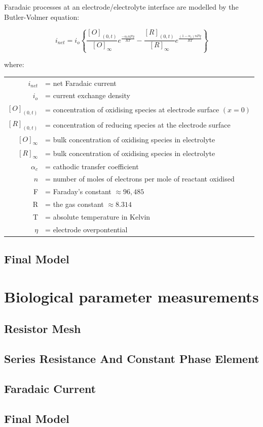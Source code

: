         Faradaic processes at an electrode/electrolyte interface are modelled by the Butler-Volmer equation:

        \begin{equation}
        i_{net}=i_{o}\left\{ \frac{[O]_{(0,t)}}{[O]_{\infty}}e^{\frac{-\alpha_{c}nF\eta}{RT}}-\frac{[R]_{(0,t)}}{[R]_{\infty}}e^{\frac{(1-\alpha_{c})nF\eta}{RT}}\right\}
        \end{equation}


        where:

        \begin{tabular}{rl}
        $i_{net}$ & = net Faradaic current\tabularnewline
        $i_{o}$ & = current exchange density\tabularnewline
        $[O]_{(0,t)}$ & = concentration of oxidising species at electrode surface $(x=0)$\tabularnewline
        $[R]_{(0,t)}$ & = concentration of reducing species at the electrode surface\tabularnewline
        $[O]_{\infty}$ & = bulk concentration of oxidising species in electrolyte\tabularnewline
        $[R]_{\infty}$ & = bulk concentration of oxidising species in electrolyte\tabularnewline
        $\alpha_{c}$ & = cathodic transfer coefficient\tabularnewline
        $n$ & = number of moles of electrons per mole of reactant oxidised\tabularnewline
        F & = Faraday's constant $\approx96,485$\tabularnewline
        R & = the gas constant $\approx8.314$\tabularnewline
        T & = absolute temperature in Kelvin\tabularnewline
        $\eta$ & = electrode overpontential\tabularnewline
        \end{tabular}


    \subsection{Final Model}

\section{Biological parameter measurements}
    \label{sect:sheep_measurements}
    \subsection{Resistor Mesh}
    \subsection{Series Resistance And Constant Phase Element}
    \subsection{Faradaic Current}
    \subsection{Final Model}

